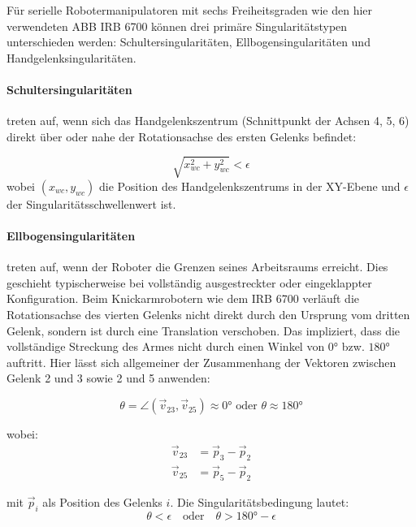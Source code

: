 \noindent
Für serielle Robotermanipulatoren mit sechs Freiheitsgraden wie den hier
verwendeten ABB IRB 6700 können drei primäre Singularitätstypen unterschieden
werden: Schultersingularitäten, Ellbogensingularitäten und
Handgelenksingularitäten.

\paragraph{Schultersingularitäten} treten auf, wenn sich das
Handgelenkszentrum (Schnittpunkt der Achsen 4, 5, 6) direkt über oder nahe der
Rotationsachse des ersten Gelenks befindet:

\begin{equation}
	\sqrt{x_{wc}^2 + y_{wc}^2} < \epsilon
	\label{eq:shoulder_singularity}
\end{equation}
\noindent
wobei $(x_{wc}, y_{wc})$ die Position des Handgelenkszentrums in der XY-Ebene
und $\epsilon$ der Singularitätsschwellenwert ist.

\paragraph{Ellbogensingularitäten} treten auf, wenn der Roboter die Grenzen seines
Arbeitsraums erreicht. Dies geschieht typischerweise bei vollständig
ausgestreckter oder eingeklappter Konfiguration. Beim Knickarmrobotern wie dem IRB 6700
verläuft die Rotationsachse des vierten Gelenks nicht direkt durch den Ursprung vom
dritten Gelenk, sondern ist durch eine Translation verschoben. Das impliziert,
dass die vollständige Streckung des Armes nicht durch einen Winkel von $0°$ bzw.
$180°$ auftritt. Hier lässt sich allgemeiner der Zusammenhang der Vektoren
zwischen Gelenk 2 und 3 sowie 2 und 5 anwenden:

\begin{equation}
	\theta = \angle(\vec{v}_{23}, \vec{v}_{25}) \approx 0° \text{ oder } \theta \approx 180°
	\label{eq:elbow_singularity}
\end{equation}

wobei:
\begin{align}
	\vec{v}_{23} & = \vec{p}_3 - \vec{p}_2 \\
	\vec{v}_{25} & = \vec{p}_5 - \vec{p}_2
\end{align}

mit $\vec{p}_i$ als Position des Gelenks $i$. Die Singularitätsbedingung lautet:
\begin{equation}
	\theta < \epsilon \quad \text{oder} \quad \theta > 180° - \epsilon
\end{equation}

